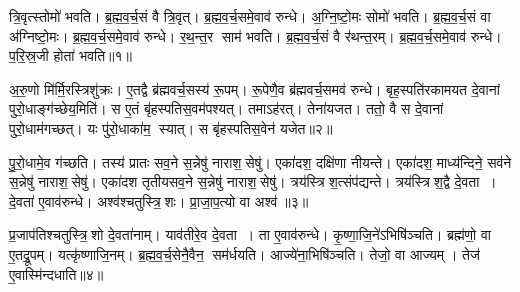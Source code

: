 

\clearpage
{}
\setcounter{anuvakam}{0}
त्रि॒वृत्स्तोमो॑ भवति। ब्र॒ह्म॒व॒र्च॒सं वै त्रि॒वृत्। ब्र॒ह्म॒व॒र्च॒समे॒वाव॑ रुन्धे। अ॒ग्नि॒ष्टो॒मः सोमो॑ भवति। ब्र॒ह्म॒व॒र्च॒सं वा अ॑ग्निष्टो॒मः। ब्र॒ह्म॒व॒र्च॒समे॒वाव॑ रुन्धे। र॒थ॒न्त॒र साम॑ भवति। ब्र॒ह्म॒व॒र्च॒सं वै र॑थन्त॒रम्। ब्र॒ह्म॒व॒र्च॒समे॒वाव॑ रुन्धे। प॒रि॒स्र॒जी होता॑ भवति॥१॥

अ॒रु॒णो मि॑र्मि॒रस्त्रिशु॑क्रः। ए॒तद्वै ब्र॑ह्मवर्च॒सस्य॑ रू॒पम्। रू॒पेणै॒व ब्र॑ह्मवर्च॒समव॑ रुन्धे। बृह॒स्पति॑रकामयत दे॒वानां पुरो॒धाङ्ग॑च्छेय॒मिति॑। स ए॒तं बृ॑हस्पतिस॒वम॑पश्यत्। तमाऽह॑रत्। तेना॑यजत। ततो॒ वै स दे॒वानां पुरो॒धाम॑गच्छत्। यः पु॑रो॒धाका॑म॒ स्यात्। स बृ॑हस्पतिस॒वेन॑ यजेत॥२॥

पु॒रो॒धामे॒व ग॑च्छति। तस्य॑ प्रातः सव॒ने स॒न्नेषु॑ नाराश॒सेषु॑। एका॑दश॒ दक्षि॑णा नीयन्ते। एका॑दश॒ माध्य॑न्दिने॒ सव॑ने स॒न्नेषु॑ नाराश॒सेषु॑। एका॑दश तृतीयसव॒ने स॒न्नेषु॑ नाराश॒सेषु॑। त्रय॑स्त्रिश॒त्संप॑द्यन्ते। त्रय॑स्त्रिश॒द्वै दे॒वता। दे॒वता॑ ए॒वाव॑रुन्धे। अश्व॑श्चतुस्त्रि॒शः। प्रा॒जा॒प॒त्यो वा अश्व॑॥३॥

प्र॒जाप॑तिश्चतुस्त्रि॒शो दे॒वता॑नाम्। याव॑तीरे॒व दे॒वता। ता ए॒वाव॑रुन्धे। कृ॒ष्णा॒जि॒ने॑ऽभिषि॑ञ्चति। ब्रह्म॑णो॒ वा ए॒तद्रू॒पम्। यत्कृ॑ष्णाजि॒नम्। ब्र॒ह्म॒व॒र्च॒सेनै॒वैन॒ सम॑र्धयति। आज्ये॑ना॒भिषि॑ञ्चति। तेजो॒ वा आज्यम्। तेज॑ ए॒वास्मि॑न्दधाति॥४॥\anuvakamend[होता॑ भवति यजेत॒ वा अश्वो॑ दधाति]

